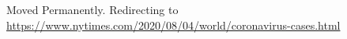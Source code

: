 Moved Permanently. Redirecting to
\url{https://www.nytimes.com/2020/08/04/world/coronavirus-cases.html}
